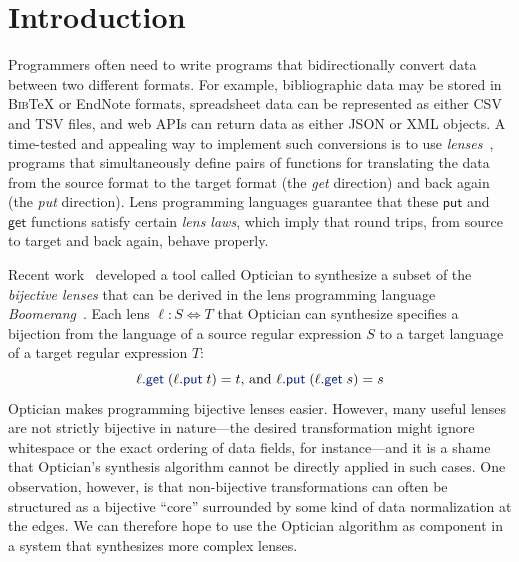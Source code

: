 \documentclass[acmsmall,review,anonymous]{acmart}
\newcommand{\kw}[1]{\textcolor{dkblue}{\ensuremath{\mathsf{#1}}}}
\newcommand{\bibtex}{\textsc{Bib}\TeX{}}
\newcommand{\get}{\ensuremath{\kw{get}}}
\newcommand{\lput}{\ensuremath{\kw{put}}}
\begin{document}
\section{Introduction}
Programmers often need to write programs that bidirectionally convert data
between two different formats. For example, bibliographic data may be stored in
\bibtex{} or EndNote formats, spreadsheet data can be represented as either CSV
and TSV files, and web APIs can return data as either JSON or XML objects.  A
time-tested and appealing way to implement such conversions is to use
\emph{lenses}~\cite{Lenses}, programs that simultaneously define pairs of
functions for translating the data from the source format to the target format
(the \emph{get} direction) and back again (the \emph{put} direction).  Lens
programming languages guarantee that these \kw{put} and \kw{get} functions
satisfy certain \emph{lens laws}, which imply that round trips, from source to
target and back again, behave properly.


Recent work~\cite{optician} developed a tool called Optician to synthesize a
subset of the {\em bijective lenses} that can be derived in the lens
programming language {\em Boomerang}~\cite{boomerang}. Each lens $\ell : S
\Leftrightarrow T$ that Optician can synthesize specifies a bijection from the
language of a source regular expression $S$ to a target language of a target
regular expression $T$: \begin{equation}\label{bijectivelenslaws} \ell.\get \;
(\ell.\lput \; t) = t \text{, and } \ell.\lput \; (\ell.\get \; s) = s
\end{equation}
Optician makes programming bijective lenses easier.  However, many useful lenses
are not strictly bijective in nature---the desired transformation might ignore
whitespace or the exact ordering of data fields, for instance---and it is a
shame that Optician's synthesis algorithm cannot be directly applied in such
cases.  One observation, however, is that non-bijective transformations can
often be structured as a bijective ``core'' surrounded by some kind of data
normalization at the edges. We can therefore hope to use the Optician algorithm
as component in a system that synthesizes more complex lenses.
\end{document}
